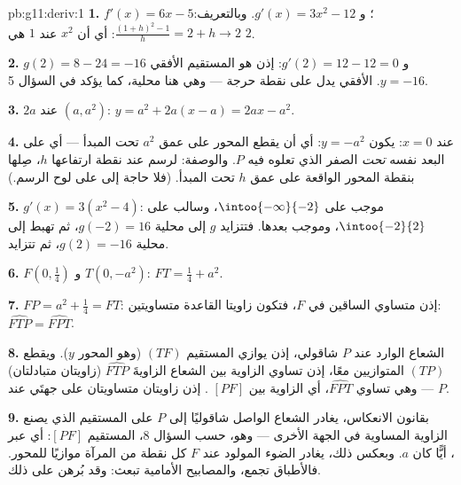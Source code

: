 \begin{solution}{pb:g11:deriv:1}
\textbf{1.} $f'(x) = 6x - 5$؛ و $g'(x) = 3x^2 - 12$. وبالتعريف:
$\frac{(1 + h)^2 - 1}{h} = 2 + h \to 2$: أي أن 
$x^2$ عند $1$ هي $2$.

\textbf{2.} $g(2) = 8 - 24 = -16$ و $g'(2) = 12 - 12 = 0$:
إذن  هو المستقيم الأفقي $y = -16$.  الأفقي
يدل على نقطة حرجة --- وهي هنا  محلية، كما
يؤكد  في السؤال 5.

\textbf{3.}  $2a$ عند $(a, a^2)$:
$y = a^2 + 2a(x - a) = 2ax - a^2$.

\textbf{4.} عند $x = 0$: يكون $y = -a^2$: أي أن  يقطع
المحور على عمق $a^2$ تحت المبدأ --- أي على البعد نفسه
\emph{تحت} الصفر الذي تعلوه فيه $P$. والوصفة: لرسم
 عند نقطة ارتفاعها $h$، صِلها بنقطة المحور الواقعة على
عمق $h$ تحت المبدأ. (فلا حاجة إلى  على
لوح الرسم.)

\textbf{5.} $g'(x) = 3(x^2 - 4)$: موجب على
$\intoo{-\infty}{-2}$، وسالب على $\intoo{-2}{2}$، وموجب
بعدها. فتتزايد $g$ إلى  محلية $g(-2) = 16$، ثم تهبط
إلى  محلية $g(2) = -16$، ثم تتزايد.

\textbf{6.} $F\left(0, \frac14\right)$ و $T(0, -a^2)$:
$FT = \frac14 + a^2$.

\textbf{7.} $FP = a^2 + \frac14 = FT$: إذن متساوي الساقين في $F$، فتكون
زاويتا القاعدة متساويتين: $\widehat{FTP} = \widehat{FPT}$.

\textbf{8.} الشعاع الوارد عند $P$ شاقولي، إذن يوازي
المستقيم $(TF)$ (وهو المحور $y$). ويقطع  $(TP)$
المتوازيين معًا، إذن تساوي الزاوية بين الشعاع 
الزاويةَ $\widehat{FTP}$ (زاويتان متبادلتان) --- وهي تساوي
$\widehat{FPT}$، أي الزاوية بين $[PF]$ .
إذن زاويتان متساويتان على جهتَي  عند $P$.

\textbf{9.} بقانون الانعكاس، يغادر الشعاع الواصل
شاقوليًا إلى $P$ على المستقيم الذي يصنع الزاوية المساوية
في الجهة الأخرى --- وهو، حسب السؤال 8، المستقيم $[PF]$: أي عبر
، أيًّا كان $a$. وبعكس ذلك، يغادر الضوء المولود عند $F$
كل نقطة من المرآة موازيًا للمحور. فالأطباق تجمع،
والمصابيح الأمامية تبعث: وقد بُرهن على ذلك.


\end{solution}
